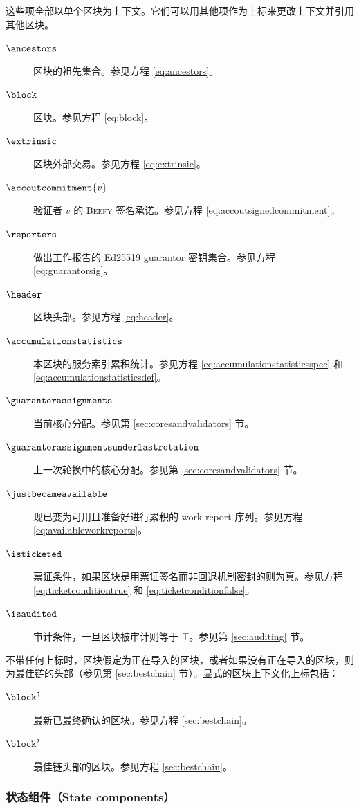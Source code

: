 这些项全部以单个区块为上下文。它们可以用其他项作为上标来更改上下文并引用其他区块。
\begin{description}
  \item[$\ancestors$] 区块的祖先集合。参见方程 \ref{eq:ancestors}。
  \item[$\block$] 区块。参见方程 \ref{eq:block}。
  \item[$\extrinsic$] 区块外部交易。参见方程 \ref{eq:extrinsic}。
  \item[$\accoutcommitment{v}$] 验证者 $v$ 的 \textsc{Beefy} 签名承诺。参见方程 \ref{eq:accoutsignedcommitment}。
  \item[$\reporters$] 做出工作报告的 Ed25519 guarantor 密钥集合。参见方程 \ref{eq:guarantorsig}。
  \item[$\header$] 区块头部。参见方程 \ref{eq:header}。
  \item[$\accumulationstatistics$] 本区块的服务索引累积统计。参见方程 \ref{eq:accumulationstatisticsspec} 和 \ref{eq:accumulationstatisticsdef}。
  \item[$\guarantorassignments$] 当前核心分配。参见第 \ref{sec:coresandvalidators} 节。
  \item[$\guarantorassignmentsunderlastrotation$] 上一次轮换中的核心分配。参见第 \ref{sec:coresandvalidators} 节。
  \item[$\justbecameavailable$] 现已变为可用且准备好进行累积的 work-report 序列。参见方程 \ref{eq:availableworkreports}。
  \item[$\isticketed$] 票证条件，如果区块是用票证签名而非回退机制密封的则为真。参见方程 \ref{eq:ticketconditiontrue} 和 \ref{eq:ticketconditionfalse}。
  \item[$\isaudited$] 审计条件，一旦区块被审计则等于 $\top$。参见第 \ref{sec:auditing} 节。
\end{description}

不带任何上标时，区块假定为正在导入的区块，或者如果没有正在导入的区块，则为最佳链的头部（参见第 \ref{sec:bestchain} 节）。显式的区块上下文化上标包括：
\begin{description}
  \item[$\block^\natural$] 最新已最终确认的区块。参见方程 \ref{sec:bestchain}。
  \item[$\block^\flat$] 最佳链头部的区块。参见方程 \ref{sec:bestchain}。
\end{description}

\subsubsection{状态组件（State components）}

